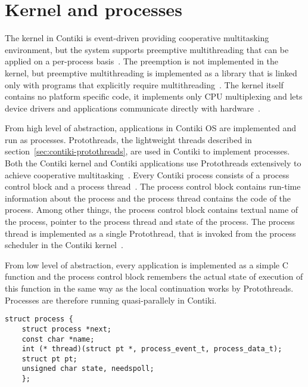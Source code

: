 
\section{Kernel and processes}
The kernel in Contiki is event-driven providing cooperative multitasking
environment, but the system supports preemptive
multithreading that can be applied on a per-process basis~\cite{video}.
The preemption is not implemented in the kernel, but
preemptive multithreading is implemented as a library that is linked only with programs that
explicitly require multithreading~\cite{paper-contiki}.
The kernel itself contains no platform specific code, it implements only CPU multiplexing and
lets device drivers and applications communicate directly with hardware~\cite{video}.

From high level of abstraction,
applications in Contiki OS are implemented and run as processes.
Protothreads, the lightweight threads described in section~\ref{sec:contiki-protothreads},
are used in Contiki to implement processes.
Both the Contiki kernel and Contiki applications use
Protothreads extensively to achieve cooperative multitasking~\cite{contiki-wiki-faq}.
Every Contiki process consists of a process control block and a process thread~\cite{contiki-wiki-processes}.
The process control block contains run-time information about the process and
the process thread contains the code of the process.
Among other things, the process control block contains
textual name of the process, pointer to the process thread and state of the process.
The process thread is implemented as a single Protothread,
that is invoked from the process scheduler in the Contiki kernel~\cite{contiki-wiki-processes}.

From low level of abstraction,
every application is implemented as a simple C function
and the process control block remembers the actual state of execution of this function
in the same way as the local continuation works by Protothreads.
Processes are therefore running quasi-parallely in Contiki.

\begin{lstlisting}[caption=Process control block in Contiki OS]
struct process {
	struct process *next;
	const char *name;
	int (* thread)(struct pt *, process_event_t, process_data_t);
	struct pt pt;
	unsigned char state, needspoll;
	};
\end{lstlisting}

